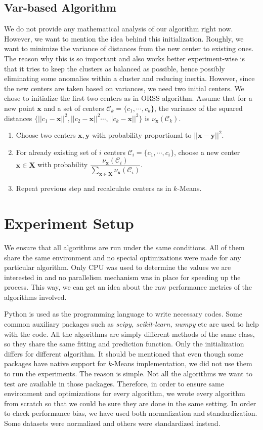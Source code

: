 \documentclass[10pt, leqno]{article}
\begin{document}
	\subsection{Var-based Algorithm}
	We do not provide any mathematical analysis of our algorithm right now. However, we want to mention the idea behind this initialization. Roughly, we want to minimize the variance of distances from the new center to existing ones. The reason why this is so important and also works better experiment-wise is that it tries to keep the clusters as balanced as possible, hence possibly eliminating some anomalies within a cluster and reducing inertia. However, since the new centers are taken based on variances, we need two initial centers. We chose to initialize the first two centers as in ORSS algorithm. Assume that for a new point $\mathbf{x}$ and a set of centers $\mathcal{C}_k=\{c_1,\cdots,c_k\}$, the variance of the squared distances $\{||c_1-\mathbf{x}||^2,||c_2-\mathbf{x}||^2\cdots,||c_k-\mathbf{x}||^2\}$ is $\nu_\mathbf{x}(\mathcal{C}_k)$.
		\begin{enumerate}[i]
			\item Choose two centers $\mathbf{x},\mathbf{y}$ with probability proportional to $||\mathbf{x}-\mathbf{y}||^2$.
			\item For already existing set of $i$ centers $\mathcal{C}_i=\{c_1,\cdots,c_i\}$, choose a new center $\mathbf{x}\in\mathbf{X}$ with probability $\dfrac{\nu_\mathbf{x}(\mathcal{C}_i)}{\sum_{\mathbf{x}\in\mathbf{X}}\nu_\mathbf{x}(\mathcal{C}_i)}$.
			\item Repeat previous step and recalculate centers as in $k$-Means.
		\end{enumerate}
	\section{Experiment Setup}
	We ensure that all algorithms are run under the same conditions. All of them share the same environment and no special optimizations were made for any particular algorithm. Only CPU was used to determine the values we are interested in and no parallelism mechanism was in place for speeding up the process. This way, we can get an idea about the raw performance metrics of the algorithms involved.
	
	Python is used as the programming language to write necessary codes. Some common auxiliary packages such as \textit{scipy, scikit-learn, numpy} etc are used to help with the code. All the algorithms are simply different methods of the same class, so they share the same fitting and prediction function. Only the initialization differs for different algorithm. It should be mentioned that even though some packages have native support for $k$-Means implementation, we did not use them to run the experiments. The reason is simple. Not all the algorithms we want to test are available in those packages. Therefore, in order to ensure same environment and optimizations for every algorithm, we wrote every algorithm from scratch so that we could be sure they are done in the same setting. In order to check performance bias, we have used both normalization and standardization. Some datasets were normalized and others were standardized instead.
	
\end{document}
